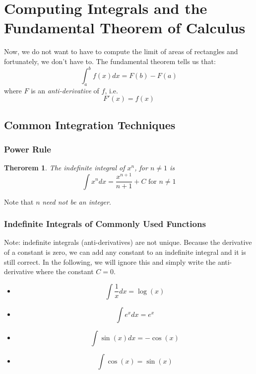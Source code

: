 \documentclass[12pt,a4paper]{article} %
\newtheorem{thm}{Therorem}
\begin{document}
\section{Computing Integrals and the Fundamental Theorem of Calculus}
Now, we do not want to have to compute the limit of areas of rectangles and fortunately, we don't have to. The fundamental theorem tells us that:
$$\int_a^b f(x) dx = F(b) - F(a)$$
where $F$ is an \emph{anti-derivative} of $f$, i.e.
$$F'(x) = f(x)$$
\subsection{Common Integration Techniques}
\subsubsection{Power Rule}
\begin{thm}
The indefinite integral of $x^n$, for $n\neq 1$ is
$$\int x^n dx = \frac{x^{n+1}}{n+1} + C\textrm{ for } n\neq 1$$ 
\end{thm} 
Note that $n$ \emph{need not be an integer}. 
\subsubsection{Indefinite Integrals of Commonly Used Functions}
Note: indefinite integrals (anti-derivatives) are not unique. Because the derivative of a constant is zero, we can add any constant to an indefinite integral and it is still correct. In the following, we will ignore this and simply write the anti-derivative where the constant $C=0$. 
\begin{itemize}
\item $$\int \frac1{x} dx = \log(x)$$
\item $$\int e^x dx= e^x$$
\item $$\int \sin(x) dx = -\cos(x)$$
\item $$\int \cos(x) = \sin(x)$$
\end{itemize}
\end{document}
